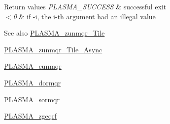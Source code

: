 \begin{DoxyRetVals}{Return values}
{\em PLASMA\_\-SUCCESS} & successful exit \\
\hline
{\em $<$0} & if -\/i, the i-\/th argument had an illegal value\\
\hline
\end{DoxyRetVals}
\begin{DoxySeeAlso}{See also}
\hyperlink{group__PLASMA__Complex64__t__Tile_gad7847b2c5996f9033b91121ce482caed_gad7847b2c5996f9033b91121ce482caed}{PLASMA\_\-zunmqr\_\-Tile} 

\hyperlink{group__PLASMA__Complex64__t__Tile__Async_ga8e057c6a0faa3eb3f371e09fd91ab994_ga8e057c6a0faa3eb3f371e09fd91ab994}{PLASMA\_\-zunmqr\_\-Tile\_\-Async} 

\hyperlink{group__PLASMA__Complex32__t_gaeb10283e0d173f28817f2909b9d4c02e_gaeb10283e0d173f28817f2909b9d4c02e}{PLASMA\_\-cunmqr} 

\hyperlink{group__double_ga5e359c405a8e6ea3e10b525174a3a3d2_ga5e359c405a8e6ea3e10b525174a3a3d2}{PLASMA\_\-dormqr} 

\hyperlink{group__float_gadfc10c1135befaa37c48b2558196999a_gadfc10c1135befaa37c48b2558196999a}{PLASMA\_\-sormqr} 

\hyperlink{group__PLASMA__Complex64__t_ga36fc6c695a8288f7ff64669c50fc4d74_ga36fc6c695a8288f7ff64669c50fc4d74}{PLASMA\_\-zgeqrf} 
\end{DoxySeeAlso}
